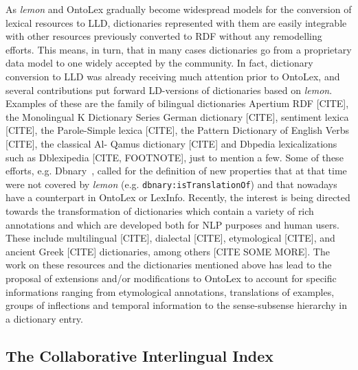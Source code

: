\documentclass[12pt,a4paper]{elex2017}
\begin{document}
As \textit{lemon} and OntoLex gradually become %
widespread models for the conversion of lexical resources to LLD, dictionaries 
represented with them are easily integrable with other resources previously 
converted to RDF without any remodelling efforts. This means, in turn, that in 
many cases dictionaries go from a proprietary data model to one widely accepted 
by the community. In fact, dictionary conversion to LLD was already receiving 
much attention prior to OntoLex, and several contributions put forward 
LD-versions of dictionaries based on \textit{lemon}. Examples of these are the 
family of bilingual dictionaries Apertium RDF [CITE], the Monolingual K 
Dictionary Series German dictionary [CITE], sentiment lexica [CITE], the 
Parole-Simple 
lexica [CITE], the Pattern Dictionary of English Verbs [CITE], the classical Al-
Qamus dictionary [CITE] and Dbpedia lexicalizations such as Dblexipedia [CITE, 
FOOTNOTE], just to mention a few. Some of these efforts, e.g.
Dbnary~\cite{serasset2015dbnary}, 
called for the definition of new properties that at that time were not covered 
by \textit{lemon} (e.g. \texttt{dbnary:isTranslationOf}) and that nowadays have 
a counterpart in OntoLex or LexInfo. Recently, the interest is being directed 
towards the transformation of dictionaries  which contain a variety of rich 
annotations and which are developed both for NLP purposes and human users. These
 include multilingual [CITE], dialectal [CITE], etymological [CITE], and ancient
  Greek [CITE] dictionaries, among others [CITE SOME MORE]. The work on these 
  resources and the dictionaries mentioned above has lead to the proposal of 
  extensions and/or modifications to OntoLex to account for specific 
  informations ranging from etymological annotations, translations of examples, 
  groups of inflections and temporal information to the sense-subsense hierarchy in
   a dictionary entry.

\subsection{The Collaborative Interlingual Index}
\end{document}
